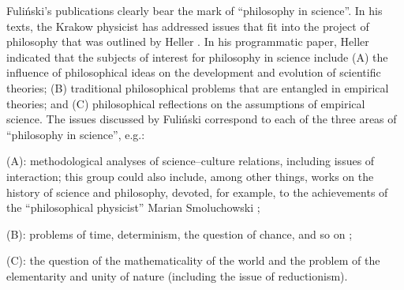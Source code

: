Fuliński's publications clearly bear the mark of ``philosophy in science''. In his texts, the Krakow physicist has addressed issues that fit into the project of philosophy that was outlined by Heller 
\parencite[][]{}. %
 In his programmatic paper, Heller indicated that the subjects of interest for philosophy in science include (A) the influence of philosophical ideas on the development and evolution of scientific theories; (B) traditional philosophical problems that are entangled in empirical theories; and (C) philosophical reflections on the assumptions of empirical science. The issues discussed by Fuliński correspond to each of the three areas of ``philosophy in science'', e.g.:



(A): methodological analyses of science–culture relations, including issues of interaction; this group could also include, among other things, works on the history of science and philosophy, devoted, for example, to the achievements of the ``philosophical physicist'' Marian Smoluchowski 
\parencite[e.g][]{fulinski_fluktuujacy_2017};%




(B): problems of time, determinism, the question of chance, and so on 
\parencites[e.g.][]{fulinski_o_1993}[][]{fulinski_profesor_2015};%




(C): the question of the mathematicality of the world and the problem of the elementarity and unity of nature (including the issue of reductionism).



